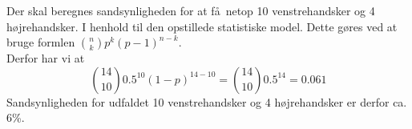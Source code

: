 {
Der skal beregnes sandsynligheden for at f\aa\ netop 10 venstrehandsker og 4 h\o jrehandsker. I henhold til den opstillede statistiske model. Dette g\o res ved at bruge formlen $\binom{n}{k}p^k(p-1)^{n-k}$. \\

Derfor har vi at
\[
\binom{14}{10}0.5^{10}(1-p)^{14-10} = \binom{14}{10}0.5^{14} = 0.061
\]
Sandsynligheden for udfaldet 10 venstrehandsker og 4 h\o jrehandsker er derfor ca. 6\%.

}
